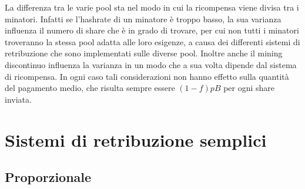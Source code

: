 La differenza tra le varie pool sta nel modo in cui la ricompensa viene divisa tra i minatori. Infatti se l'hashrate di un minatore è troppo basso, la sua varianza influenza il numero di share che è in grado di trovare, per cui non tutti i minatori troveranno la stessa pool adatta alle loro esigenze, a causa dei differenti sistemi di retribuzione che sono implementati sulle diverse pool. Inoltre anche il mining discontinuo influenza la varianza in un modo che a sua volta dipende dal sistema di ricompensa.
In ogni caso tali considerazioni non hanno effetto sulla quantità del pagamento medio, che risulta sempre essere $(1-f)pB$ per ogni share inviata.

\section{Sistemi di retribuzione semplici}

\subsection{Proporzionale}\label{pool-proporzionale}

